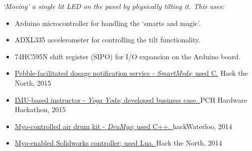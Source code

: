 \documentclass{resume}
\begin{document}
\textit{`Moving' a single lit LED on the panel by physically tilting it. This uses:}
\begin{itemize}
  \item Arduino microcontroller for handling the `smarts and magic'.
  \item ADXL335 accelerometer for controlling the tilt functionality. 
  \item 74HC595N shift register (SIPO) for I/O expansion on the Arduino board.
\end{itemize}
\nspacen{}

\begin{itemize}
  \item \href{https://github.com/DChang87/HtN}{Pebble-facilitated dosage notification service - \textit{SmartMeds}; used C.} \hfill Hack the North, 2015
  \item \href{jkkd.com}{IMU-based instructor - \textit{Yoga Yoda}; developed business case. \hfill} PCH Hardware Hackathon, 2015
  \item \href{http://devpost.com/software/drumyo}{Myo-controlled air drum kit - \textit{DruMyo}; used C++. \hfill} hackWaterloo, 2014
  \item \href{https://github.com/fanwashere/SolidWorksControls}{Myo-enabled Solidworks controller; used Lua. \hfill} Hack the North, 2014
\end{itemize}

\begin{comment}
\datedsubsection{\textbf{Open-Ended Course\textsuperscript{2} Project}}{Sep -- Dec 2013}
\textsuperscript{2}\textit{Mechatronics Engineering, Digital Computation}
\begin{itemize}
  \item Built a fully functional robot on the Lego Mindstorms NXT platform.
  \item 
\end{itemize}
\end{comment}
\nspace{}
\end{document}
